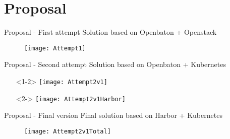 \section{Proposal}
\begin{frame}{Proposal - First attempt}
  Solution based on Openbaton + Openstack
  \begin{figure}
    \centering
    \texttt{[image: Attempt1]}
  \end{figure}
\end{frame}

\begin{frame}{Proposal - Second attempt}
  Solution based on Openbaton + Kubernetes
  \begin{itemize}
    \centering
  \item[]<1-2> \texttt{[image: Attempt2v1]}
  \item[]<2-> \texttt{[image: Attempt2v1Harbor]}
  \end{itemize}
\end{frame}

\begin{frame}{Proposal - Final version}
  Final solution based on Harbor + Kubernetes
  \begin{figure}
    \centering
    \texttt{[image: Attempt2v1Total]}
  \end{figure}
\end{frame}

